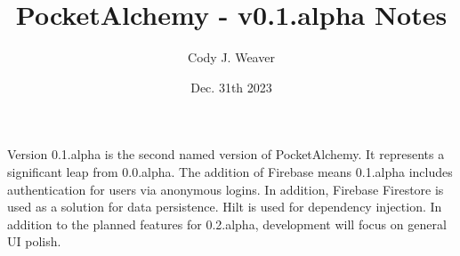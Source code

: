 \documentclass[12pt]{article}
\begin{document}
\title{PocketAlchemy - v0.1.alpha Notes}
\author{Cody J. Weaver}
\date{Dec. 31th 2023}
\maketitle

\begin{center}

\indent Version 0.1.alpha is the second named version of PocketAlchemy.
It represents a significant leap from 0.0.alpha. The addition of Firebase means 
0.1.alpha includes authentication for users via anonymous logins. In addition,
Firebase Firestore is used as a solution for data persistence.
Hilt is used for dependency injection. In addition to the planned features
for 0.2.alpha, development will focus on general UI polish.

\end{center}
    
\end{document}
